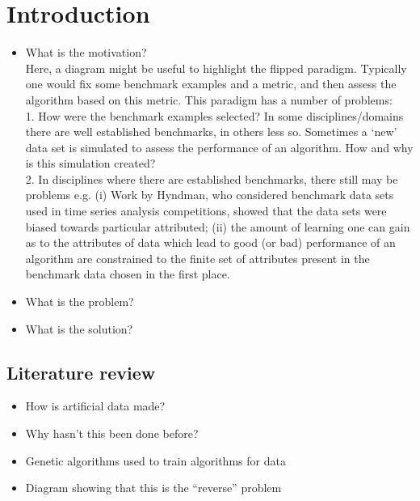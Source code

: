 \section{Introduction}\label{section:introduction}


\begin{itemize}
    \item What is the motivation?\\ Here, a diagram might be useful to highlight
        the flipped paradigm. Typically one would fix some benchmark examples
        and a metric, and then assess the algorithm based on this metric. This
        paradigm has a number of problems:\\ 1. How were the benchmark examples
        selected? In some disciplines/domains there are well established
        benchmarks, in others less so. Sometimes a `new' data set is simulated
        to assess the performance of an algorithm. How and why is this
        simulation created?\\ 2. In disciplines where there are established
        benchmarks, there still may be problems e.g. (i) Work by Hyndman, who
        considered benchmark data sets used in time series analysis
        competitions, showed that the data sets were biased towards particular
        attributed; (ii) the amount of learning one can gain as to the
        attributes of data which lead to good (or bad) performance of an
        algorithm are constrained to the finite set of attributes present in the
        benchmark data chosen in the first place.
    \item What is the problem?
    \item What is the solution?
\end{itemize}

\subsection{Literature review}

\begin{itemize}
    \item How is artificial data made?
    \item Why hasn't this been done before?
    \item Genetic algorithms used to train algorithms for data
    \item Diagram showing that this is the ``reverse'' problem
\end{itemize}
